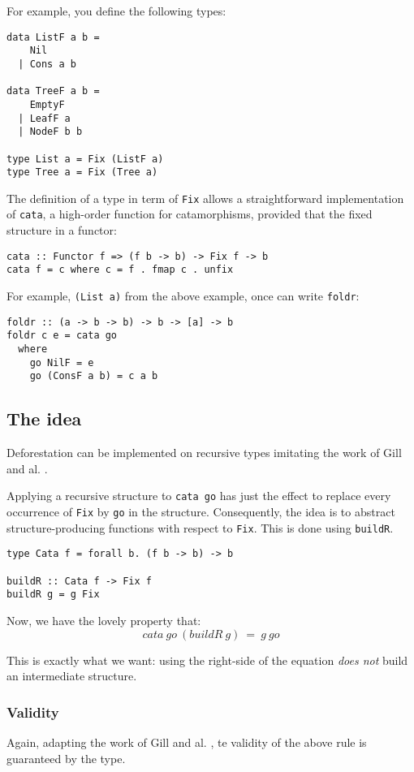 \documentclass[format=sigplan]{acmart}
\newcommand{\minline}[1]{\texttt{#1}}
\begin{document}
For example, you define the following types:
\begin{verbatim}
data ListF a b =
    Nil
  | Cons a b
  
data TreeF a b =
    EmptyF
  | LeafF a
  | NodeF b b
  
type List a = Fix (ListF a)
type Tree a = Fix (Tree a)
\end{verbatim}

The definition of a type in term of \minline{Fix} allows a straightforward implementation of \minline{cata}, a high-order function for catamorphisms, provided that the fixed structure in a functor:
\begin{verbatim}
cata :: Functor f => (f b -> b) -> Fix f -> b
cata f = c where c = f . fmap c . unfix
\end{verbatim}

For example, \minline{(List a)} from the above example, once can write \minline{foldr}:
\begin{verbatim}
foldr :: (a -> b -> b) -> b -> [a] -> b
foldr c e = cata go
  where
    go NilF = e
    go (ConsF a b) = c a b
\end{verbatim}

\subsection{The idea}
Deforestation can be implemented on recursive types imitating the work of Gill and al. \cite{Gill:1993:SCD:165180.165214}.

Applying a recursive structure to \minline{cata go} has just the effect to replace every occurrence of \minline{Fix} by \minline{go} in the structure. Consequently, the idea is to abstract structure-producing functions with respect to \minline{Fix}. This is done using \minline{buildR}.

\begin{verbatim}
type Cata f = forall b. (f b -> b) -> b

buildR :: Cata f -> Fix f
buildR g = g Fix
\end{verbatim}

Now, we have the lovely property that:
$$cata\ go\ (buildR\ g)\ =\ g\ go$$

This is exactly what we want: using the right-side of the equation \emph{does not}
build an intermediate structure.

\subsubsection{Validity}
Again, adapting the work of Gill and al. \cite{Gill:1993:SCD:165180.165214}, te validity of the above rule is guaranteed by the type.
\end{document}
